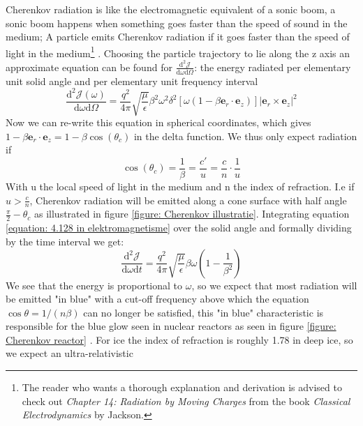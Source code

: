\documentclass[11pt,a4paper,faculty=we,language=en,doctype=report]{cls/ugent-doc}
\begin{document}
Cherenkov radiation is like the electromagnetic equivalent of a sonic boom, a
sonic boom happens when something goes faster than the speed of sound in the
medium; A particle emits Cherenkov radiation if it goes faster than the speed
of light in the medium\footnote{The reader who wants a thorough explanation and
derivation is advised to check out \textit{Chapter 14: Radiation by Moving
Charges} from the book \textit{Classical Electrodynamics} by Jackson.} .
Choosing the particle trajectory to lie along the z axis an approximate
equation can be found\cite{jackson1998classical} for $\frac{\text{d}^2
\mathscr{J}}{\text{d}\omega \text{d}\Omega}$: the energy radiated per
elementary unit solid angle and per elementary unit frequency interval
\begin{equation}
	\frac{\text{d}^2 \mathscr{J}(\omega)}{\text{d} \omega \text{d} \Omega} = \frac{q^2}{4\pi}\sqrt{\frac{\mu}{\epsilon}}\beta^2\omega^2\delta^2[\omega(1-\beta \mathbf{e}_r\cdot\mathbf{e}_z)]|\mathbf{e}_r\times\mathbf{e}_z|^2 \label{equation: 4.128 in elektromagnetisme}
\end{equation}
Now we can re-write this equation in spherical coordinates, which gives $1-\beta \mathbf{e}_r\cdot\mathbf{e}_z = 1-\beta\cos(\theta_c)$ in the delta function. We thus only expect radiation if
\begin{equation}
\cos(\theta_c) = \frac{1}{\beta} = \frac{c'}{u} = \frac{c}{n}\cdot\frac{1}{u}
\end{equation}
With u the local speed of light in the medium and n the index of refraction.
I.e if $u>\frac{c}{n}$, Cherenkov radiation will
be emitted along a cone surface with half angle $\frac{\pi}{2}-\theta_c$ as
illustrated in figure \ref{figure: Cherenkov illustratie}. Integrating equation
\ref{equation: 4.128 in elektromagnetisme} over the solid angle and formally
dividing by the time interval we get:
\begin{equation}
	\frac{\text{d}^2\mathscr{J}}{\text{d}\omega \text{d}t} = \frac{q^2}{4\pi}\sqrt{\frac{\mu}{\epsilon}}\beta\omega\left(1-\frac{1}{\beta^2}\right)	
\end{equation}
We see that the energy is proportional to $\omega$, so we expect that most
radiation will be emitted "in blue" with a cut-off frequency above which the
equation $\cos\theta = 1/(n\beta)$ can no longer be satisfied, this "in blue"
characteristic is responsible for the blue glow seen in nuclear reactors as
seen in figure \ref{figure: Cherenkov reactor} .  For ice the index of
refraction is roughly 1.78 in deep ice, so we expect an ultra-relativistic
\end{document}
